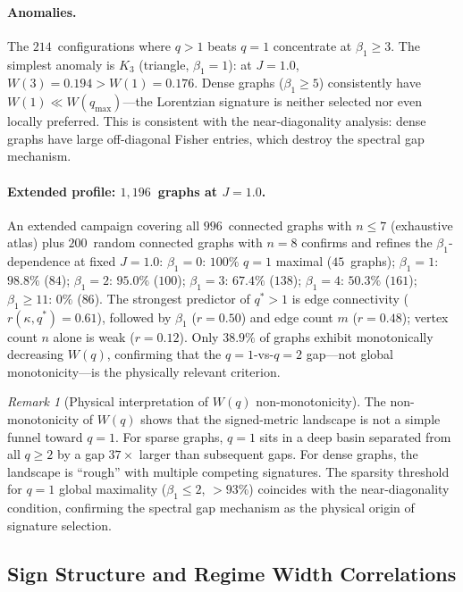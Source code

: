 \documentclass[11pt]{article}
\theoremstyle{definition}
\theoremstyle{remark}
\newtheorem{remark}[theorem]{Remark}
\begin{document}
\paragraph{Anomalies.}
The $214$~configurations where $q > 1$ beats $q = 1$ concentrate at
$\beta_1 \geq 3$. The simplest anomaly is $K_3$ (triangle, $\beta_1 = 1$):
at $J = 1.0$, $W(3) = 0.194 > W(1) = 0.176$. Dense graphs ($\beta_1 \geq 5$)
consistently have $W(1) \ll W(q_{\max})$---the Lorentzian signature is neither
selected nor even locally preferred. This is consistent with the near-diagonality
analysis: dense graphs have large off-diagonal Fisher entries, which destroy the
spectral gap mechanism.

\paragraph{Extended profile: $1{,}196$~graphs at $J = 1.0$.}
An extended campaign covering all $996$~connected graphs with $n \leq 7$
(exhaustive atlas) plus $200$~random connected graphs with $n = 8$
confirms and refines the $\beta_1$-dependence at fixed $J = 1.0$:
$\beta_1 = 0$: $100\%$ $q{=}1$ maximal ($45$~graphs);
$\beta_1 = 1$: $98.8\%$ ($84$);
$\beta_1 = 2$: $95.0\%$ ($100$);
$\beta_1 = 3$: $67.4\%$ ($138$);
$\beta_1 = 4$: $50.3\%$ ($161$);
$\beta_1 \geq 11$: $0\%$ ($86$).
The strongest predictor of $q^* > 1$ is edge connectivity
($r(\kappa, q^*) = 0.61$), followed by $\beta_1$ ($r = 0.50$)
and edge count $m$ ($r = 0.48$); vertex count $n$ alone is weak
($r = 0.12$). Only $38.9\%$ of graphs exhibit monotonically decreasing
$W(q)$, confirming that the $q = 1$-vs-$q = 2$ gap---not global
monotonicity---is the physically relevant criterion.

\begin{remark}[Physical interpretation of $W(q)$ non-monotonicity]
\label{rem:wq-nonmonotone}
The non-monotonicity of $W(q)$ shows that the signed-metric landscape is
not a simple funnel toward $q = 1$. For sparse graphs, $q = 1$ sits in a
deep basin separated from all $q \geq 2$ by a gap $37\times$ larger than
subsequent gaps. For dense graphs, the landscape is ``rough'' with multiple
competing signatures. The sparsity threshold for $q = 1$ global maximality
($\beta_1 \leq 2$, $> 93\%$) coincides with the near-diagonality condition,
confirming the spectral gap mechanism as the physical origin of signature selection.
\end{remark}

\subsection{Sign Structure and Regime Width Correlations}
\label{sec:sign-structure}
\end{document}
